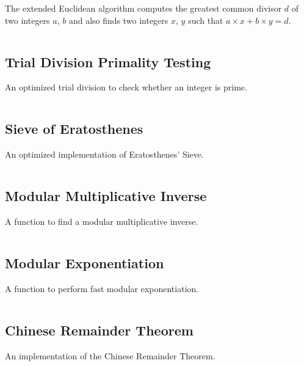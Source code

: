 \documentclass[8pt,a4paper]{amsart}
\newcommand{\code}[1]{\inputminted[linenos]{cpp}{_code/#1}}
\begin{document}
        The extended Euclidean algorithm computes the greatest common divisor
        $d$ of two integers $a$, $b$ and also finds two integers $x$, $y$ such
        that $a\times x + b\times y = d$.
        \code{mathematics/egcd.cpp}

    \subsection{Trial Division Primality Testing}
        An optimized trial division to check whether an integer is prime.
        \code{mathematics/is_prime.cpp}

    \subsection{Sieve of Eratosthenes}
        An optimized implementation of Eratosthenes' Sieve.
        \code{mathematics/prime_sieve.cpp}

    \subsection{Modular Multiplicative Inverse}
        A function to find a modular multiplicative inverse.
        \code{mathematics/mod_inv.cpp}

    \subsection{Modular Exponentiation}
        A function to perform fast modular exponentiation.
        \code{mathematics/mod_pow.cpp}

    \subsection{Chinese Remainder Theorem}
        An implementation of the Chinese Remainder Theorem.
        \code{mathematics/crt.cpp}
\end{document}
